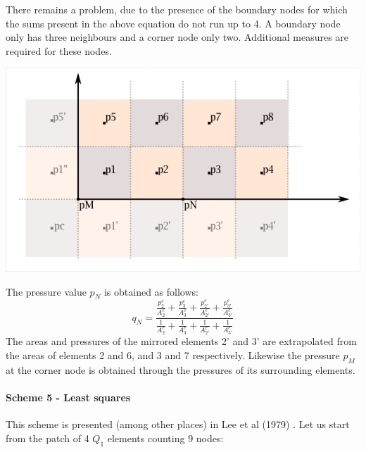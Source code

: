 There remains a problem, due to the presence of the boundary nodes for which 
the sums present in the above equation do not run up to 4. A boundary
node only has three neighbours and a corner node only two. Additional measures
are required for these nodes. 

\begin{center}
\includegraphics[width=0.5\linewidth]{images/pressure_smoothing/newalgo_corner.png}
\end{center}

The pressure value $p_N$ is obtained as follows:
\[
q_N = \frac{ 
 \frac{p_2^e}   {A_2^e}
+\frac{p_3^e}   {A_3^e}
+\frac{p_{2'}^e}{A_{2'}^e}
+\frac{p_{3'}^e}{A_{3'}^e}
}{
 \frac{1}{A_2^e}
+\frac{1}{A_3^e}
+\frac{1}{A_{2'}^e}
+\frac{1}{A_{3'}^e}
}
\]
The areas and pressures of the mirrored elements 2' and 3' are extrapolated from the areas of elements 2 and 6, and 3 and 7 respectively. 
Likewise the pressure $p_M$ at the corner node is obtained through the pressures of its surrounding elements.


\paragraph{Scheme 5 - Least squares} This scheme is presented (among other places) in Lee et al (1979)
\cite{legs79}. 
Let us start from the patch of 4 $Q_1$ elements counting 9 nodes: 

